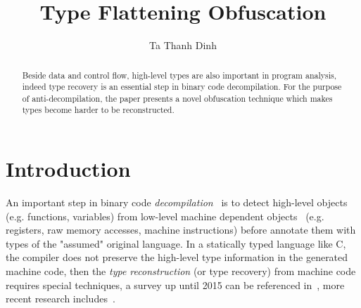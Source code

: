 \documentclass[a4paper]{llncs}
\begin{document}
%
\title{Type Flattening Obfuscation}
%
%
\author{Ta Thanh Dinh}
%
%
%
\maketitle              %
%
\begin{abstract}
	Beside data and control flow, high-level types are also important in program analysis,
	indeed type recovery is an essential step in binary code decompilation.
	For the purpose of anti-decompilation, the paper presents a novel obfuscation
	technique which makes types become harder to be reconstructed.



\end{abstract}
%
%
%
\section{Introduction}
An important step in binary code \emph{decompilation}~\cite{cifuentes_reverse_1994} is to
detect high-level objects (e.g. functions, variables) from low-level machine dependent
objects~\cite{balakrishnan_divine_2007} (e.g. registers, raw memory accesses, machine
instructions) before annotate them with types of the "assumed" original language.
In a statically typed language like C, the compiler does not preserve the high-level
type information in the generated machine code,
then the \emph{type reconstruction} (or type recovery) from machine code requires
special techniques, a survey up until 2015 can be referenced in~\cite{caballero_type_2016}, more
recent research includes~\cite{noonan_polymorphic_2016, maier_typeminer_2019, katz_estimating_2016}.
\end{document}
